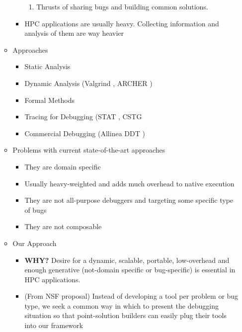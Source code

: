\begin{itemize}
\begin{itemize}
\begin{itemize}
\begin{enumerate}
			\item Thrusts of sharing bugs and building common solutions.				
			\end{enumerate}
		\item HPC applications are usually heavy. Collecting information and analysis of them are way heavier		 
		\end{itemize}
	\item Approaches
		\begin{itemize}
		\item Static Analysis
		\item Dynamic Analysis (Valgrind \cite{valgrind}, ARCHER \cite{archer})
		\item Formal Methods
		\item Tracing for Debugging (STAT \cite{stat}, CSTG \cite{cstg}
		\item Commercial Debugging (Allinea DDT \cite{ddt})
		\end{itemize}
	\item Problems with current state-of-the-art approaches
		\begin{itemize}
		\item They are domain specific
		\item Usually heavy-weighted and adds much overhead to native execution
		\item They are not all-purpose debuggers and targeting some specific type of bugs
		\item They are not composable
		\end{itemize}
	\item Our Approach
		\begin{itemize}
		\item \textbf{WHY?} Desire for a dynamic, scalable, portable, low-overhead and enough generative (not-domain specific or bug-specific) is essential in HPC applications.
		\item (From NSF proposal) Instead of developing a tool per problem or bug type, we seek a common way in which to present the debugging situation so that point-solution builders can easily plug their tools into our framework

\end{itemize}
\end{itemize}
\end{itemize}
